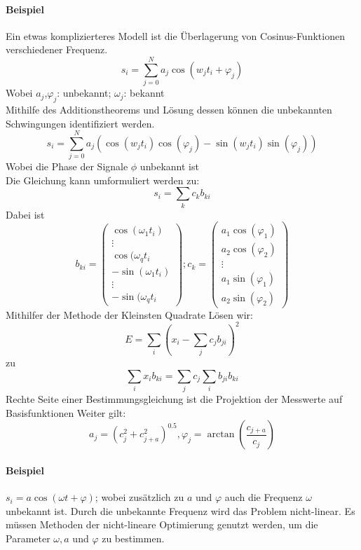 \begin{enumerate}
\paragraph{Beispiel} Ein etwas komplizierteres Modell ist die Überlagerung von Cosinus-Funktionen verschiedener Frequenz.
\[
s_i=\sum\limits_{j=0}^N a_j \cos(w_jt_i+\varphi_j)
\]
Wobei $a_j$,$\varphi_j$: unbekannt; $\omega_j$: bekannt\\
Mithilfe des Additionstheorems und Lösung dessen können die unbekannten Schwingungen identifiziert werden.
\[
s_i=\sum\limits_{j=0}^N a_j (\cos(w_jt_i)\cos(\varphi_j) - \sin(w_jt_i) \sin(\varphi_j))
\]
Wobei die Phase der Signale $\phi$ unbekannt ist\\
Die Gleichung kann umformuliert werden zu:
\[
s_i=\sum\limits_k c_k b_{ki}
\]
Dabei ist
\[
b_{ki}=
\begin{pmatrix}
\cos(\omega_1t_i)\\
\vdots \\
\cos(\omega_qt_i \\
-\sin(\omega_1t_i)\\
\vdots \\
-\sin(\omega_qt_i
\end{pmatrix}
; c_k=
\begin{pmatrix} 
a_1 \cos(\varphi_1)\\
a_2 \cos(\varphi_2)\\
\vdots\\
a_1 \sin(\varphi_1) \\
a_2 \sin(\varphi_2)
\end{pmatrix}
\]
Mithilfer der Methode der Kleinsten Quadrate Lösen wir:
\[
E = \sum\limits_i \left(x_i- \sum\limits_j c_j b_{ji} \right)^2
\]
zu
\[
\sum\limits_i x_i b_{ki} = \sum\limits_j c_j\sum\limits_i b_{ji}b_{ki}
\]
Rechte Seite einer Bestimmungsgleichung ist die Projektion der Messwerte auf Basisfunktionen
Weiter gilt:
\[
a_j=(c_j^2+c_{j+a}^2)^{0.5}, \varphi_j=\arctan(\frac{c_{j+a}}{c_j})
\]

\paragraph{Beispiel} $s_i=a \cos(\omega t + \varphi)$; wobei zusätzlich zu $a$ und $\varphi$ auch die Frequenz $\omega$ unbekannt ist. Durch die unbekannte Frequenz wird das Problem nicht-linear. Es müssen Methoden der nicht-lineare Optimierung genutzt werden, um die Parameter $\omega, a$ und $\varphi$ zu bestimmen.
\end{enumerate}

